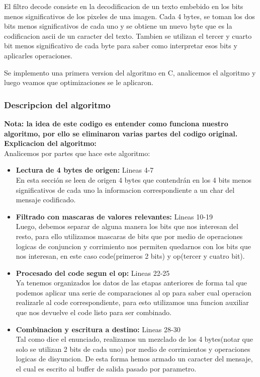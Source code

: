 El filtro decode consiste en la decodificacion de un texto embebido en los bits menos significativos de los pixeles de una imagen. Cada 4 bytes, se toman los dos bits menos significativos de cada uno y se obtiene un nuevo byte que es la codificacion ascii de un caracter del texto. Tambien se utilizan el tercer y cuarto bit menos significativo de cada byte para saber como interpretar esos bits y aplicarles operaciones.
\par
\bigskip
Se implemento una primera version del algoritmo en C, analicemos el algoritmo y luego veamos que optimizaciones se le aplicaron.
\subsubsection{Descripcion del algoritmo}

\textbf{Nota: la idea de este codigo es entender como funciona nuestro algoritmo, por ello se eliminaron varias partes del codigo original.}\\

\textbf{Explicacion del algoritmo:}\\
Analicemos por partes que hace este algoritmo:\\
\begin{itemize}
    \item \textbf{Lectura de 4 bytes de origen:} Lineas 4-7\\
        En esta sección se leen de origen 4 bytes que contendrán en los 4 bits menos significativos de cada uno la informacion correspondiente a un char del mensaje codificado.
    \item \textbf{Filtrado con mascaras de valores relevantes:} Lineas 10-19\\
        Luego, debemos separar de alguna manera los bits que nos interesan del resto, para ello utilizamos mascaras de bits que por medio de operaciones logicas de conjuncion y corrimiento nos permiten quedarnos con los bits que nos interesan, en este caso code(primeros 2 bits) y op(tercer y cuatro bit).
    \item \textbf{Procesado del code segun el op:} Lineas 22-25\\
        Ya tenemos organizados los datos de las etapas anteriores de forma tal que podemos aplicar una serie de comparaciones al op para saber cual operacion realizarle al code correspondiente, para esto utilizamos una funcion auxiliar que nos devuelve el code listo para ser combinado.
    \item \textbf{Combinacion y escritura a destino:} Lineas 28-30\\
        Tal como dice el enunciado, realizamos un mezclado de los 4 bytes(notar que solo se utilizan 2 bits de cada uno) por medio de corrimientos y operaciones logicas de disyuncion. De esta forma hemos armado un caracter del mensaje, el cual es escrito al buffer de salida pasado por parametro.
\end{itemize}
